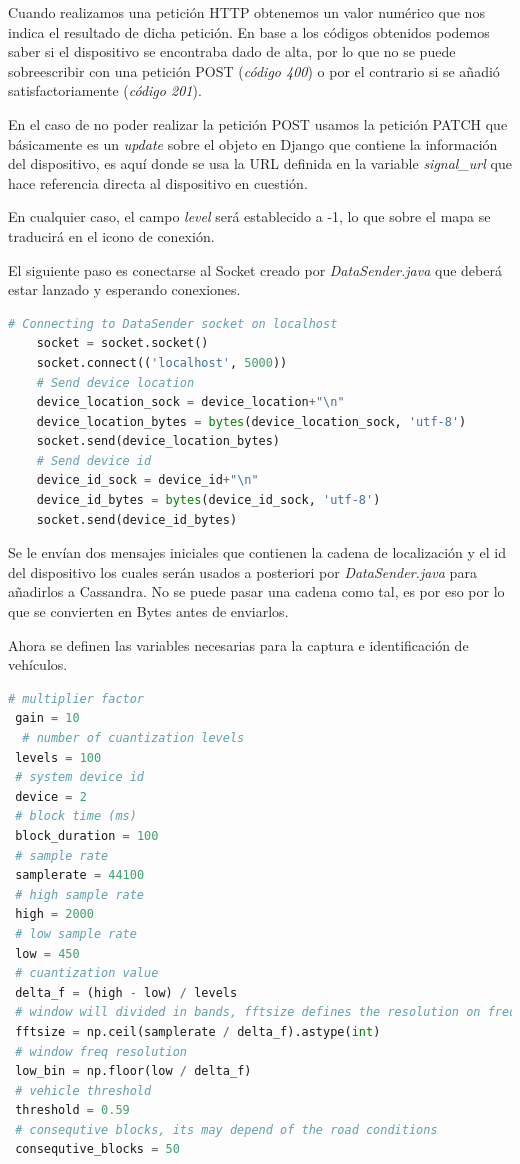Cuando realizamos una petición HTTP obtenemos un valor numérico que nos indica el resultado de dicha petición. En base a los códigos obtenidos podemos saber si el dispositivo se encontraba dado de alta, por lo que no se puede sobreescribir con una petición POST (\textit{código 400}) o por el contrario si se añadió satisfactoriamente (\textit{código 201}).

En el caso de no poder realizar la petición POST usamos la petición PATCH que básicamente es un \textit{update} sobre el objeto en Django que contiene la información del dispositivo, es aquí donde se usa la URL definida en la variable \textit{signal\_url} que hace referencia directa al dispositivo en cuestión.

En cualquier caso, el campo \textit{level} será establecido a -1, lo que sobre el mapa se traducirá en el icono de conexión.

\newpage

El siguiente paso es conectarse al Socket creado por \textit{DataSender.java} que deberá estar lanzado y esperando conexiones.

\begin{lstlisting}[language=python,caption={Conexión con Java mediante un Socket},label={lst:pi1}]
	# Connecting to DataSender socket on localhost
	socket = socket.socket()
	socket.connect(('localhost', 5000))
	# Send device location
	device_location_sock = device_location+"\n"
	device_location_bytes = bytes(device_location_sock, 'utf-8')
	socket.send(device_location_bytes)
	# Send device id
	device_id_sock = device_id+"\n"
	device_id_bytes = bytes(device_id_sock, 'utf-8')
	socket.send(device_id_bytes)
\end{lstlisting}

Se le envían dos mensajes iniciales que contienen la cadena de localización y el id del dispositivo los cuales serán usados a posteriori por \textit{DataSender.java} para añadirlos a Cassandra. No se puede pasar una cadena como tal, es por eso por lo que se convierten en Bytes antes de enviarlos.

\bigskip

Ahora se definen las variables necesarias para la captura e identificación de vehículos.

\begin{lstlisting}[language=python,caption={Variables corresopndientes al análisis},label={lst:pi1}]
 # multiplier factor
 gain = 10
  # number of cuantization levels
 levels = 100
 # system device id
 device = 2
 # block time (ms)
 block_duration = 100
 # sample rate
 samplerate = 44100
 # high sample rate
 high = 2000
 # low sample rate
 low = 450
 # cuantization value
 delta_f = (high - low) / levels
 # window will divided in bands, fftsize defines the resolution on freq domain
 fftsize = np.ceil(samplerate / delta_f).astype(int)
 # window freq resolution
 low_bin = np.floor(low / delta_f)
 # vehicle threshold
 threshold = 0.59
 # consequtive blocks, its may depend of the road conditions
 consequtive_blocks = 50
\end{lstlisting}

